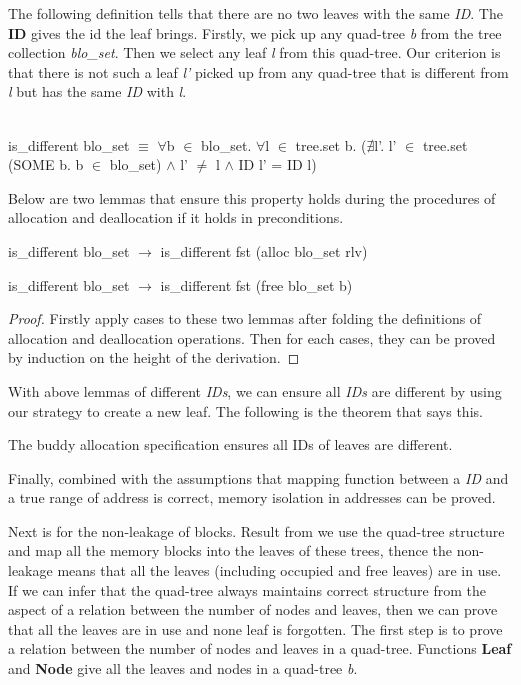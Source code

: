The following definition tells that there are no two leaves with the same \emph{ID}. The \textbf{ID} gives the id the leaf brings. Firstly, we pick up any quad-tree \emph{b} from the tree collection \emph{blo\_set}. Then we select any leaf \emph{l} from this quad-tree. Our criterion is that there is not such a leaf \emph{l'} picked up from any quad-tree that is different from \emph{l} but has the same \emph{ID} with \emph{l}.

\begin{definition}  \\
	is\_different blo\_set $\equiv$ $\forall$b $\in$ blo\_set. $\forall$l $\in$ tree.set b. ($\nexists$l'. l' $\in$ tree.set (SOME b. b $\in$ blo\_set) $\wedge$ l' $\ne$ l $\wedge$ ID l' = ID l)
\end{definition}

Below are two lemmas that ensure this property holds during the procedures of allocation and deallocation if it holds in preconditions.

\begin{lemma}
	is\_different blo\_set $\longrightarrow$ is\_different fst (alloc blo\_set rlv)
\end{lemma}

\begin{lemma}
	is\_different blo\_set $\longrightarrow$ is\_different fst (free blo\_set b)
\end{lemma}

\begin{proof}
	Firstly apply cases to these two lemmas after folding the definitions of allocation and deallocation operations. Then for each cases, they can be proved by induction on the height of the derivation.
\end{proof}

With above lemmas of different \emph{IDs}, we can ensure all \emph{IDs} are different by using our strategy to create a new leaf. The following is the theorem that says this.

\begin{theorem}
	The buddy allocation specification ensures all IDs of leaves are different.
\end{theorem}

Finally, combined with the assumptions that mapping function between a \emph{ID} and a true range of address is correct, memory isolation in addresses can be proved.

Next is for the non-leakage of blocks. Result from we use the quad-tree structure and map all the memory blocks into the leaves of these trees, thence the non-leakage means that all the leaves (including occupied and free leaves) are in use. If we can infer that the quad-tree always maintains correct structure from the aspect of a relation between the number of nodes and leaves, then we can prove that all the leaves are in use and none leaf is forgotten. The first step is to prove a relation between the number of nodes and leaves in a quad-tree. Functions \textbf{Leaf} and \textbf{Node} give all the leaves and nodes in a quad-tree \emph{b}.

